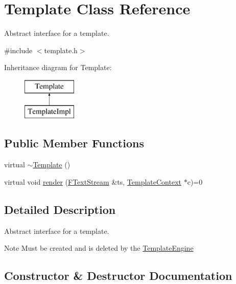 \hypertarget{class_template}{}\section{Template Class Reference}
\label{class_template}


Abstract interface for a template.  




{\ttfamily \#include $<$template.\+h$>$}

Inheritance diagram for Template\+:\begin{figure}[H]
\begin{center}
\leavevmode
\includegraphics[height=2.000000cm]{class_template}
\end{center}
\end{figure}
\subsection*{Public Member Functions}
\begin{DoxyCompactItemize}
\item 
virtual \mbox{\hyperlink{class_template_a42de08b6f1a3e319f351d412ab721b25}{$\sim$\+Template}} ()
\item 
virtual void \mbox{\hyperlink{class_template_af9582cccc21e9aea39bd3fdbc609b03c}{render}} (\mbox{\hyperlink{class_f_text_stream}{F\+Text\+Stream}} \&ts, \mbox{\hyperlink{class_template_context}{Template\+Context}} $\ast$c)=0
\end{DoxyCompactItemize}


\subsection{Detailed Description}
Abstract interface for a template. 

\begin{DoxyNote}{Note}
Must be created and is deleted by the \mbox{\hyperlink{class_template_engine}{Template\+Engine}} 
\end{DoxyNote}


\subsection{Constructor \& Destructor Documentation}
\mbox{\label{class_template_a42de08b6f1a3e319f351d412ab721b25}} 
